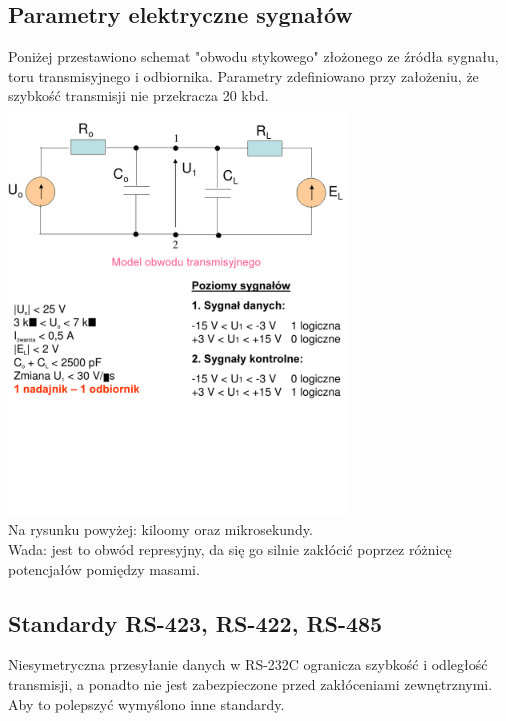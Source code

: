 \documentclass[a4paper,twoside]{article}
\begin{document}
	\subsection{Parametry elektryczne sygnałów}
	Poniżej przestawiono schemat "obwodu stykowego" złożonego ze źródła sygnału, toru transmisyjnego i odbiornika. Parametry zdefiniowano przy założeniu, że szybkość transmisji nie przekracza 20 kbd.
	\includegraphics[width=9cm]{./wyklady/RS232_10_1.pdf}\\
	Na rysunku powyżej: kiloomy oraz mikrosekundy.\\
	Wada: jest to obwód represyjny, da się go silnie zakłócić poprzez różnicę potencjałów pomiędzy masami.
	\subsection{Standardy RS-423, RS-422, RS-485}
	Niesymetryczna przesyłanie danych w RS-232C ogranicza szybkość i odległość transmisji, a ponadto nie jest zabezpieczone przed zakłóceniami zewnętrznymi. Aby to polepszyć wymyślono inne standardy.
\end{document}
